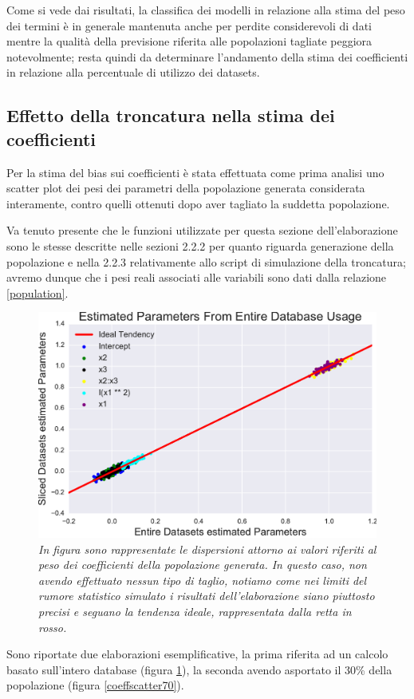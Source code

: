 \documentclass[12pt,openright,twoside,a4paper]{book}
\begin{document}
Come si vede dai risultati, la classifica dei modelli in relazione alla stima del peso dei termini è in generale mantenuta anche per perdite considerevoli di dati mentre la qualità della previsione riferita alle popolazioni tagliate peggiora notevolmente; resta quindi da determinare l'andamento della stima dei coefficienti in relazione alla percentuale di utilizzo dei datasets.


\subsection{Effetto della troncatura nella stima dei coefficienti }

Per la stima del bias sui coefficienti è stata effettuata come prima analisi uno scatter plot dei pesi dei parametri della popolazione generata considerata interamente, contro quelli ottenuti dopo aver tagliato la suddetta popolazione.

Va tenuto presente che le funzioni utilizzate per questa sezione dell'elaborazione sono le stesse descritte nelle sezioni  2.2.2 per quanto riguarda generazione della popolazione e nella 2.2.3 relativamente allo script di simulazione della troncatura; avremo dunque che i pesi reali associati alle variabili sono dati dalla relazione \ref{population}.

\begin{figure}[!h]
\centering
\includegraphics[width=0.55\linewidth]{coeffscatter100}
\caption{\textit{In figura sono rappresentate le dispersioni attorno ai valori riferiti al peso dei coefficienti della popolazione generata. 
In questo caso, non avendo effettuato nessun tipo di taglio, notiamo come nei limiti del rumore statistico simulato i risultati dell'elaborazione siano piuttosto precisi e seguano la tendenza ideale, rappresentata dalla retta in rosso.}}
\label{coeffscatter100}
\end{figure}

 Sono riportate due elaborazioni esemplificative, la prima riferita ad un calcolo basato sull'intero database (figura \ref{coeffscatter100}), la seconda avendo asportato il 30\% della popolazione (figura \ref{coeffscatter70}).
\end{document}
